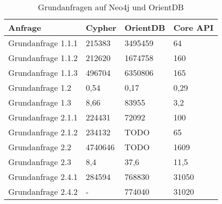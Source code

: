 \begin{table}[h]
	\centering
	\begin{tabular}{ |p{6cm}||p{2cm}|p{2cm}|p{2cm}|  }
		\hline
		Anfrage& Cypher & OrientDB & Core API \\
		\hline
	Grundanfrage 1.1.1  & 215383 & 3495459    &  64\\
	Grundanfrage 1.1.2& 212620 & 1674758   & 160   \\
	Grundanfrage 1.1.3& 496704 & 6350806 & 165  \\
	Grundanfrage 1.2& 0,54 & 0,17   & 0,29   \\
	Grundanfrage 1.3 & 8,66& 83955  & 3,2    \\
	Grundanfrage 2.1.1& 224431 & 72092   & 100   \\
	Grundanfrage 2.1.2& 234132& TODO  & 65    \\
	Grundanfrage 2.2& 4740646 & TODO    & 1609  \\
	Grundanfrage 2.3& 8,4  & 37,6   & 11,5   \\
	Grundanfrage 2.4.1& 284594 & 768830  & 31050\\
	Grundanfrage 2.4.2& -  & 774040   & 31020   \\
		\hline
	\end{tabular}
	\caption{Grundanfragen auf Neo4j und OrientDB}
	\label{tab:Query3}
\end{table}
\FloatBarrier

